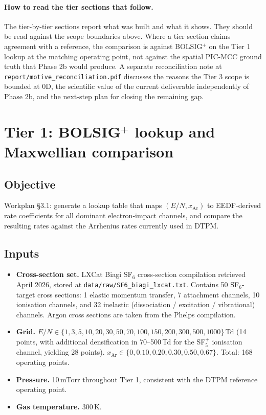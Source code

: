 \documentclass[11pt,a4paper]{article}
\begin{document}
\paragraph{How to read the tier sections that follow.}
The tier-by-tier sections report what was built and what it
shows. They should be read against the scope boundaries above.
Where a tier section claims agreement with a reference, the
comparison is against BOLSIG$^+$ on the Tier 1 lookup at the
matching operating point, not against the spatial PIC-MCC ground
truth that Phase 2b would produce. A separate reconciliation
note at \texttt{report/motive\_reconciliation.pdf} discusses the
reasons the Tier 3 scope is bounded at 0D, the scientific value
of the current deliverable independently of Phase 2b, and the
next-step plan for closing the remaining gap.

\section{Tier 1: BOLSIG$^+$ lookup and Maxwellian comparison}
\label{sec:tier1}

\subsection{Objective}
Workplan §3.1: generate a lookup table that maps
$(E/N, x_{\mathrm{Ar}})$ to EEDF-derived rate coefficients for all
dominant electron-impact channels, and compare the resulting
rates against the Arrhenius rates currently used in DTPM.

\subsection{Inputs}
\begin{itemize}
  \item \textbf{Cross-section set.} LXCat Biagi SF$_6$
    cross-section compilation retrieved April 2026, stored at
    \texttt{data/raw/SF6\_biagi\_lxcat.txt}. Contains 50
    SF$_6$-target cross sections: 1 elastic momentum transfer,
    7 attachment channels, 10 ionisation channels, and 32
    inelastic (dissociation / excitation / vibrational)
    channels. Argon cross sections are taken from the Phelps
    compilation.
  \item \textbf{Grid.} $E/N \in \{1, 3, 5, 10, 20, 30, 50, 70,
    100, 150, 200, 300, 500, 1000\}$\,Td (14 points, with
    additional densification in 70--500\,Td for the SF$_5^+$
    ionisation channel, yielding 28 points). $x_{\mathrm{Ar}}
    \in \{0, 0.10, 0.20, 0.30, 0.50, 0.67\}$. Total: 168
    operating points.
  \item \textbf{Pressure.} 10\,mTorr throughout Tier 1, consistent
    with the DTPM reference operating point.
  \item \textbf{Gas temperature.} 300\,K.
\end{itemize}
\end{document}
